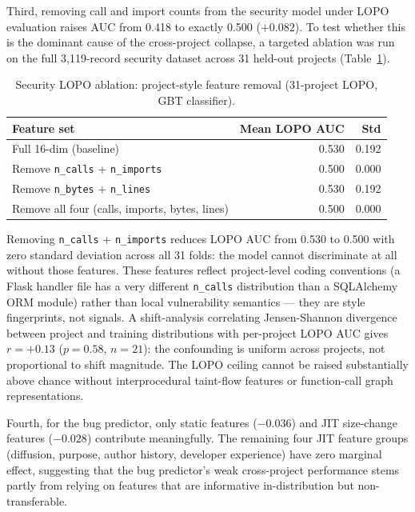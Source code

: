\documentclass[12pt, oneside]{report}
\begin{document}
Third, removing call and import counts from the security model under LOPO evaluation
raises AUC from 0.418 to exactly 0.500 ($+0.082$). To test whether this is the dominant
cause of the cross-project collapse, a targeted ablation was run on the full 3,119-record
security dataset across 31 held-out projects (Table~\ref{tab:security-style-ablation}).

\begin{table}[H]
\centering
\caption{Security LOPO ablation: project-style feature removal (31-project LOPO, GBT classifier).}
\label{tab:security-style-ablation}
\begin{tabular}{@{}lrr@{}}
\toprule
\textbf{Feature set} & \textbf{Mean LOPO AUC} & \textbf{Std} \\
\midrule
Full 16-dim (baseline)                          & 0.530 & 0.192 \\
Remove \texttt{n\_calls} + \texttt{n\_imports}  & 0.500 & 0.000 \\
Remove \texttt{n\_bytes} + \texttt{n\_lines}    & 0.530 & 0.192 \\
Remove all four (calls, imports, bytes, lines)  & 0.500 & 0.000 \\
\bottomrule
\end{tabular}
\end{table}

Removing \texttt{n\_calls} + \texttt{n\_imports} reduces LOPO AUC from 0.530 to 0.500 with zero standard deviation across all 31 folds: the model cannot discriminate at all without those features. These features reflect project-level coding conventions (a Flask handler file has a very different \texttt{n\_calls} distribution than a SQLAlchemy ORM module) rather than local vulnerability semantics — they are style fingerprints, not signals. A shift-analysis correlating Jensen-Shannon divergence between project and training distributions with per-project LOPO AUC gives $r = +0.13$ ($p = 0.58$, $n = 21$): the confounding is uniform across projects, not proportional to shift magnitude. The LOPO ceiling cannot be raised substantially above chance without interprocedural taint-flow features or function-call graph representations.

Fourth, for the bug predictor, only static features ($-0.036$) and JIT size-change
features ($-0.028$) contribute meaningfully. The remaining four JIT feature groups
(diffusion, purpose, author history, developer experience) have zero marginal effect,
suggesting that the bug predictor's weak cross-project performance stems partly from
relying on features that are informative in-distribution but non-transferable.
\end{document}

